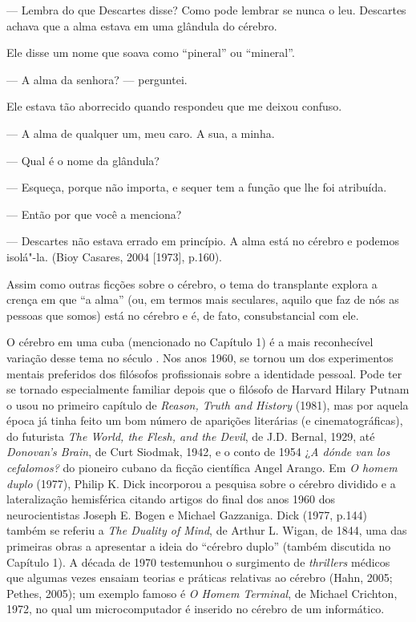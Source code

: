 --- Lembra do que Descartes disse? Como pode lembrar se nunca o leu.
Descartes achava que a alma estava em uma glândula do cérebro.

Ele disse um nome que soava como ``pineral'' ou ``mineral''.

--- A alma da senhora? --- perguntei.

Ele estava tão aborrecido quando respondeu que me deixou confuso.

--- A alma de qualquer um, meu caro. A sua, a minha.

--- Qual é o nome da glândula?

--- Esqueça, porque não importa, e sequer tem a função que lhe foi
atribuída.

--- Então por que você a menciona?

--- Descartes não estava errado em princípio. A alma está no cérebro e
podemos isolá"-la. (Bioy Casares, 2004 {[}1973{]}, p.160).

Assim como outras ficções sobre o cérebro, o tema do transplante explora
a crença em que ``a alma'' (ou, em termos mais seculares, aquilo que faz
de nós as pessoas que somos) está no cérebro e é, de fato,
consubstancial com ele.

O cérebro em uma cuba (mencionado no Capítulo 1) é a mais reconhecível
variação desse tema no século . Nos anos 1960, se tornou um dos
experimentos mentais preferidos dos filósofos profissionais sobre a
identidade pessoal. Pode ter se tornado especialmente familiar depois
que o filósofo de Harvard Hilary Putnam o usou no primeiro capítulo de
\emph{Reason, Truth and History} (1981), mas por aquela época já tinha
feito um bom número de aparições literárias (e cinematográficas), do
futurista \emph{The World, the Flesh, and the Devil}, de J.D. Bernal,
1929, até \emph{Donovan's Brain}, de Curt Siodmak, 1942, e o conto de
1954 ¿\emph{A dónde van los cefalomos?} do pioneiro cubano da ficção
científica Angel Arango. Em \emph{O homem duplo} (1977), Philip K. Dick
incorporou a pesquisa sobre o cérebro dividido e a lateralização
hemisférica citando artigos do final dos anos 1960 dos neurocientistas
Joseph E. Bogen e Michael Gazzaniga. Dick (1977, p.144) também se
referiu a \emph{The Duality of Mind}, de Arthur L. Wigan, de 1844, uma
das primeiras obras a apresentar a ideia do ``cérebro duplo'' (também
discutida no Capítulo 1). A década de 1970 testemunhou o surgimento de
\emph{thrillers} médicos que algumas vezes ensaiam teorias e práticas
relativas ao cérebro (Hahn, 2005; Pethes, 2005); um exemplo famoso é
\emph{O Homem Terminal}, de Michael Crichton, 1972, no qual um
microcomputador é inserido no cérebro de um informático.

